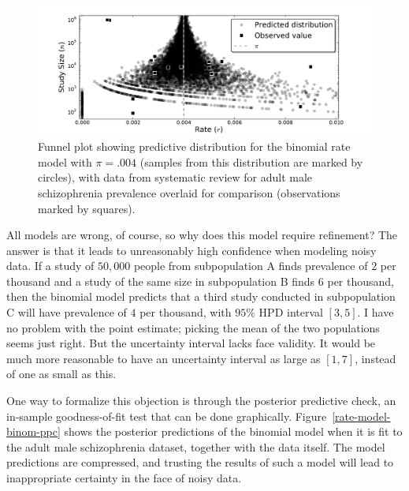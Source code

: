 \begin{figure}[ht]
\begin{center}
\includegraphics[width=\textwidth]{binomial-model-funnel.pdf}
\end{center}
\caption{Funnel plot showing predictive distribution for the binomial
  rate model with $\pi=.004$ (samples from this distribution are
  marked by circles), with data from systematic review for adult male
  schizophrenia prevalence overlaid for comparison (observations
  marked by squares).}
\label{rate-model-binom-funnel}
\end{figure}

All models are wrong, of course, so why does this model require
refinement? The answer is that it leads to unreasonably high
confidence when modeling noisy data.  If a study of $50,000$ people
from subpopulation A finds prevalence of $2$ per thousand and a study
of the same size in subpopulation B finds $6$ per thousand, then the
binomial model predicts that a third study conducted in subpopulation
C will have prevalence of $4$ per thousand, with $95\%$ HPD interval
$[3,5]$.  I have no problem with the point estimate; picking the mean
of the two populations seems just right.  But the uncertainty interval
lacks face validity.  It would be much more reasonable to have an
uncertainty interval as large as $[1,7]$, instead of one as small as
this.

One way to formalize this objection is through the posterior
predictive check, an in-sample goodness-of-fit test that can be done
graphically.  Figure~\ref{rate-model-binom-ppc} shows the posterior
predictions of the binomial model when it is fit to the adult male
schizophrenia dataset, together with the data itself.  The model
predictions are compressed, and trusting the results of such a model
will lead to inappropriate certainty in the face of noisy data.

